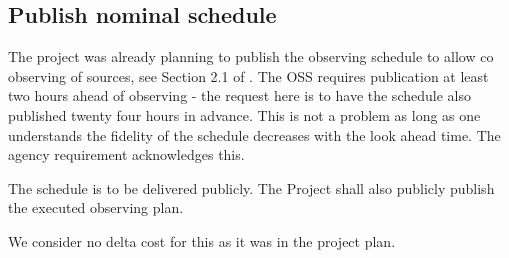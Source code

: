 \subsection{Publish nominal schedule} \label{sec:6publish}

The project was already planning to publish the observing schedule to allow co observing of sources, see Section 2.1 of .
The \gls{OSS} requires  publication at least two  hours ahead of observing - the request here is to have the schedule also published twenty four hours in advance.
This is not a problem as long as one understands the fidelity of the schedule decreases with the look ahead time.
The agency requirement acknowledges this.

The schedule is to be delivered publicly.
The Project shall also publicly publish the executed observing  plan.

We consider no delta cost for this as it was in the project plan.

